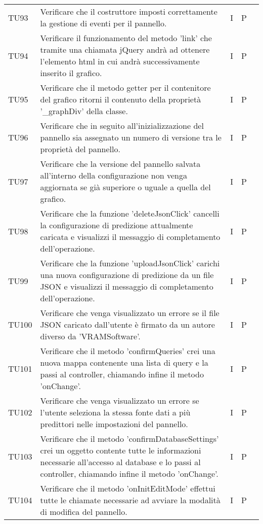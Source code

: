 \begin{longtable} {
		>{}p{15mm} 
		>{}p{79.5mm}
		>{}p{15mm} 
		>{}p{15mm}
		>{}p{0mm}}
	TU93		& Verificare che il costruttore imposti correttamente la gestione di eventi per il pannello.& I & P &\TBstrut \\ [2mm]
	TU94		& Verificare il funzionamento del metodo 'link' che tramite una chiamata jQuery andrà ad ottenere l'elemento html in cui andrà successivamente inserito il grafico.& I & P &\TBstrut \\ [2mm]
	TU95		& Verificare che il metodo getter per il contenitore del grafico ritorni il contenuto della proprietà '\_graphDiv' della classe.& I & P &\TBstrut \\ [2mm]
	TU96		& Verificare che in seguito all'inizializzazione del pannello sia assegnato un numero di versione tra le proprietà del pannello.& I & P &\TBstrut \\ [2mm]
	TU97		& Verificare che la versione del pannello salvata all'interno della configurazione non venga aggiornata se già superiore o uguale a quella del grafico.& I & P &\TBstrut \\ [2mm]
	TU98		& Verificare che la funzione 'deleteJsonClick' cancelli la configurazione di predizione attualmente caricata e visualizzi il messaggio di completamento dell'operazione.& I & P &\TBstrut \\ [2mm]
	TU99		    & Verificare che la funzione 'uploadJsonClick' carichi una nuova configurazione di predizione da un file JSON e visualizzi il messaggio di completamento dell'operazione.& I & P &\TBstrut \\ [2mm]
	TU100		& Verificare che venga visualizzato un errore se il file JSON caricato dall'utente è firmato da un autore diverso da 'VRAMSoftware'.& I & P &\TBstrut \\ [2mm]
	TU101		& Verificare che il metodo 'confirmQueries' crei una nuova mappa contenente una lista di query e la passi al controller, chiamando infine il metodo 'onChange'.& I & P &\TBstrut \\ [2mm]
	TU102		& Verificare che venga visualizzato un errore se l'utente seleziona la stessa fonte dati a più predittori nelle impostazioni del pannello.& I & P &\TBstrut \\ [2mm]
	TU103		& Verificare che il metodo 'confirmDatabaseSettings' crei un oggetto contente tutte le informazioni necessarie all'accesso al database e lo passi al controller, chiamando infine il metodo 'onChange'.& I & P &\TBstrut \\ [2mm]
	TU104		& Verificare che il metodo 'onInitEditMode' effettui tutte le chiamate necessarie ad avviare la modalità di modifica del pannello.& I & P &\TBstrut \\ [2mm]

\end{longtable}
